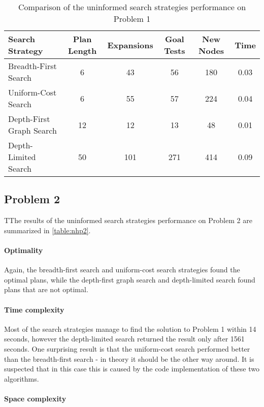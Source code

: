 \documentclass[11pt]{article}
\begin{document}
\begin{table}[H]
  \centering
  \caption{Comparison of the uninformed search strategies performance on Problem 1}
  \bigskip
  \label{table:nhp1}
  \bgroup
  \def\arraystretch{1.5}
  \begin{tabular}{l|c|c|c|c|c}
    Search Strategy & Plan Length & Expansions & Goal Tests & New Nodes & Time \\
    \hline
    Breadth-First Search & 6 & 43 & 56 & 180 & 0.03 \\
    Uniform-Cost Search & 6 & 55 & 57 & 224 & 0.04 \\
    Depth-First Graph Search & 12 & 12 & 13 & 48 & 0.01 \\
    Depth-Limited Search & 50 & 101 & 271 & 414 & 0.09 \\
  \end{tabular}
  \egroup
\end{table}

\subsection{Problem 2}

TThe results of the uninformed search strategies performance on Problem 2 are summarized in \ref{table:nhp2}.

\paragraph{Optimality}

Again, the breadth-first search and uniform-cost search strategies found the optimal plans, while the depth-first graph search and depth-limited search found plans that are not optimal.

\paragraph{Time complexity}

Most of the search strategies manage to find the solution to Problem 1 within 14 seconds, however the depth-limited search returned the result only after 1561 seconds. One surprising result is that the uniform-cost search performed better than the breadth-first search - in theory it should be the other way around. It is suspected that in this case this is caused by the code implementation of these two algorithms.

\paragraph{Space complexity}
\end{document}
